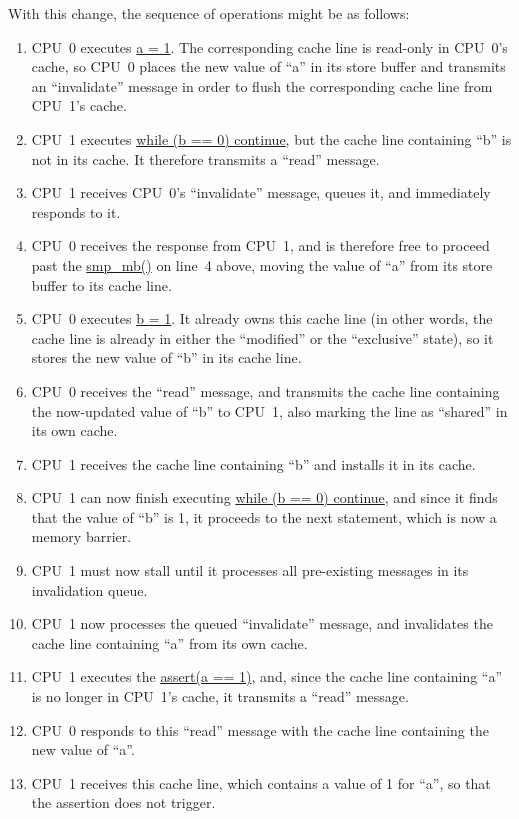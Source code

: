 With this change, the sequence of operations might be as follows:
\begin{enumerate}
\item	CPU~0 executes \url{a = 1}.  The corresponding
	cache line is read-only in
	CPU~0's cache, so CPU~0 places the new value of ``a'' in its
	store buffer and transmits an ``invalidate'' message in order
	to flush the corresponding cache line from CPU~1's cache.
\item	CPU~1 executes \url{while (b == 0) continue}, but the cache line
	containing ``b'' is not in its cache.
	It therefore transmits a ``read'' message.
\item	CPU~1 receives CPU~0's ``invalidate'' message, queues it, and
	immediately responds to it.
\item	CPU~0 receives the response from CPU~1, and is therefore free
	to proceed past the \url{smp_mb()} on line~4 above, moving
	the value of ``a'' from its store buffer to its cache line.
\item	CPU~0 executes \url{b = 1}.
	It already owns this cache line (in other words, the cache line
	is already in either the ``modified'' or the ``exclusive'' state),
	so it stores the new value of ``b'' in its cache line.
\item	CPU~0 receives the ``read'' message, and transmits the
	cache line containing the now-updated value of ``b''
	to CPU~1, also marking the line as ``shared'' in its own cache.
\item	CPU~1 receives the cache line containing ``b'' and installs
	it in its cache.
\item	CPU~1 can now finish executing \url{while (b == 0) continue},
	and since it finds that the value of ``b'' is 1, it proceeds
	to the next statement, which is now a memory barrier.
\item	CPU~1 must now stall until it processes all pre-existing
	messages in its invalidation queue.
\item	CPU~1 now processes the queued
	``invalidate'' message, and
	invalidates the cache line containing ``a'' from its own cache.
\item	CPU~1 executes the \url{assert(a == 1)}, and, since the
	cache line containing ``a'' is no longer in CPU~1's cache,
	it transmits a ``read'' message.
\item	CPU~0 responds to this ``read'' message with the cache line
	containing the new value of ``a''.
\item	CPU~1 receives this cache line, which contains a value of 1 for
	``a'', so that the assertion does not trigger.
\end{enumerate}

